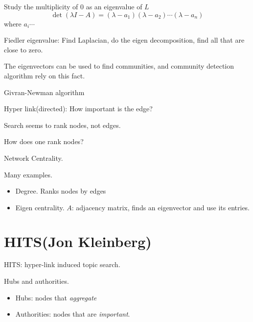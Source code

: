 \begin{note}
	Study the multiplicity of \(0\) as an eigenvalue of \(L\)
	\[
		\det(\lambda I - A) = (\lambda - a_1)(\lambda - a_2)\cdots (\lambda - a_n)
	\]
	where \(a_i\cdots \)
\end{note}

\begin{definition}
	Fiedler eigenvalue:
	Find Laplacian, do the eigen decomposition, find all that are close to zero.
\end{definition}

The eigenvectors can be used to find communities, and community detection algorithm rely on this fact.

\hr

\begin{prev}
	Givran-Newman algorithm
\end{prev}
\begin{problem}
Hyper link(directed): How important is the edge?
\end{problem}
\begin{answer}
	Search seems to rank nodes, not edges.
\end{answer}

\hr

\begin{problem}
How does one rank nodes?
\end{problem}
\begin{answer}
	Network Centrality.
\end{answer}

\hr

\begin{eg}
	Many examples.
	\begin{itemize}
		\item Degree. Ranks nodes by edges
		\item Eigen centrality. \(A\): adjacency matrix, finds an eigenvector and use its entries.
	\end{itemize}
\end{eg}

\section{HITS(Jon Kleinberg)}
HITS: hyper-link induced topic search.

Hubs and authorities.
\begin{itemize}
	\item Hubs: nodes that \emph{aggregate}
	\item Authorities: nodes that are \emph{important}.
\end{itemize}

